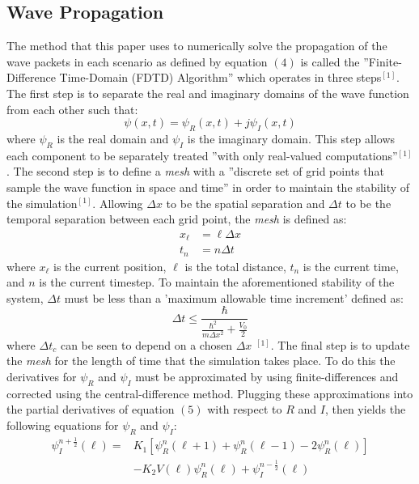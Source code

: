 \documentclass[twocolumn]{article}
\begin{document}
\subsection{Wave Propagation}
\hspace{\parindent}The method that this paper uses to numerically solve the propagation of the wave packets in each scenario as defined by equation $(4)$ is called the ''Finite-Difference Time-Domain (FDTD) Algorithm'' which operates in three steps$^{[1]}$. The first step is to separate the real and imaginary domains of the wave function from each other such that:
\begin{equation}
	\psi(x,t)=\psi_R(x,t)+j\psi_I(x,t)
\end{equation}
where $\psi_R$ is the real domain and $\psi_I$ is the imaginary domain. This step allows each component to be separately treated ''with only real-valued computations''$^{[1]}$. The second step is to define a \textit{mesh} with a ''discrete set of grid points that sample the wave function in space and time'' in order to maintain the stability of the simulation$^{[1]}$. Allowing $\Delta x$ to be the spatial separation and $\Delta t$ to be the temporal separation between each grid point, the \textit{mesh} is defined as:
\begin{align}
	x_\ell &= \ell\Delta x \\
	t_n &= n\Delta t
\end{align}
where $x_\ell$ is the current position, $\ell$ is the total distance, $t_n$ is the current time, and $n$ is the current timestep. To maintain the aforementioned stability of the system, $\Delta t$ must be less than a 'maximum allowable time
increment' defined as:
\begin{equation}
	\Delta t \leq \frac{\hbar}{\frac{\hbar^2}{m\Delta x^2}+\frac{V_0}{2}}
\end{equation}
where $\Delta t_c$ can be seen to depend on a chosen $\Delta x$ $^{[1]}$.
The final step is to update the \textit{mesh} for the length of time that the simulation takes place. To do this the derivatives for $\psi_R$ and $\psi_I$ must be approximated by using finite-differences and corrected using the central-difference method. Plugging these approximations into the partial derivatives of equation $(5)$ with respect to $R$ and $I$, then yields the following equations for $\psi_R$ and $\psi_I$: 
\begin{equation}
\begin{split}
  \psi_I^{n+\frac{1}{2}}(\ell) = &K_1[\psi_R^n(\ell+1)+\psi_R^n(\ell-1)-2\psi_R^{n}(\ell)]\\ 
  &-K_2V(\ell)\psi_R^n(\ell)+\psi_I^{n-\frac{1}{2}}(\ell)
\end{split}
\end{equation}
\end{document}
